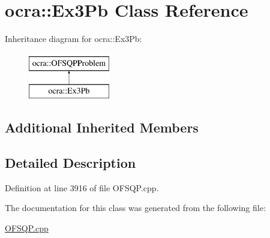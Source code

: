 \hypertarget{classocra_1_1Ex3Pb}{}\section{ocra\+:\+:Ex3\+Pb Class Reference}
\label{classocra_1_1Ex3Pb}
Inheritance diagram for ocra\+:\+:Ex3\+Pb\+:\begin{figure}[H]
\begin{center}
\leavevmode
\includegraphics[height=2.000000cm]{d7/d00/classocra_1_1Ex3Pb}
\end{center}
\end{figure}
\subsection*{Additional Inherited Members}


\subsection{Detailed Description}


Definition at line 3916 of file O\+F\+S\+Q\+P.\+cpp.



The documentation for this class was generated from the following file\+:\begin{DoxyCompactItemize}
\item 
\hyperlink{OFSQP_8cpp}{O\+F\+S\+Q\+P.\+cpp}\end{DoxyCompactItemize}
